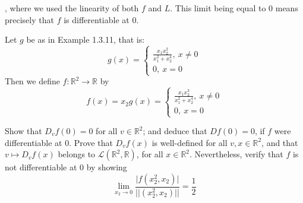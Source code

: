 \begin{solution}
    , where we used the linearity of both $f$ and $L$.
    This limit being equal to 0 means precisely that $f$ is differentiable at 0.
    
\end{solution}

\newpage

\begin{exercise}{10}
    Let $g$ be as in Example 1.3.11, that is:
    $$g(x) = \begin{cases}
        \frac{x_1 x_2^2}{x_1^2 + x_2^4},\ x \neq 0 \\
        0,\ x = 0
    \end{cases}$$ 
    Then we define $f: \mathbb{R}^2 \rightarrow \mathbb{R}$ by
    $$f(x) = x_2 g(x) = \begin{cases}
        \frac{x_1 x_2^3}{x_1^2 + x_2^4},\ x \neq 0 \\
        0,\ x = 0
    \end{cases}$$

    Show that $D_v f(0) = 0$ for all $v \in \mathbb{R}^2$; and deduce that $D f(0) = 0$, if $f$ were differentiable at 0. Prove that $D_v f(x)$ is well-defined for all $v, x \in \mathbb{R}^2$, and that $v \mapsto D_v f(x)$ belongs to $\mathcal{L}(\mathbb{R}^2, \mathbb{R})$, for all $x \in \mathbb{R}^2$.
    Nevertheless, verify that $f$ is not differentiable at 0 by showing
    $$\lim_{x_2 \rightarrow 0} \frac{\lvert f(x_2^2, x_2) \rvert}{\lvert \lvert (x_2^2, x_2) \rvert \rvert} = \frac{1}{2}$$
\end{exercise}

